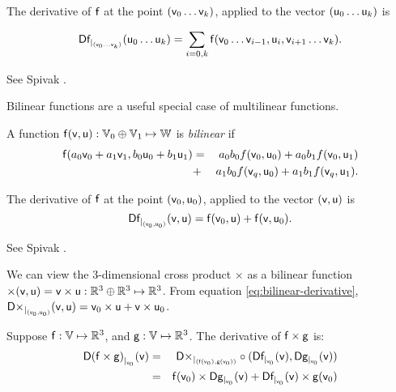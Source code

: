 The derivative of $\mathsf{f}$
at the point $(\mathsf{v}_0 \ldots \mathsf{v}_k)$, applied to the vector $(\mathsf{u}_0 \ldots \mathsf{u}_k)$ is

\begin{equation}
{\mathsf{D}{\mathsf{f}}_{\mid_{(\mathsf{v}_0 \ldots \mathsf{v}_k)}}({\mathsf{u}_0 \ldots \mathsf{u}_k})}
 =  \sum_{i=0,k} \mathsf{f}(\mathsf{v}_0 \ldots \mathsf{v}_{i-1},\mathsf{u}_i,\mathsf{v}_{i+1} \ldots \mathsf{v}_k).
\end{equation}

See Spivak \cite[ex.~2-14]{spivak-1965}.

\label{sec:Derivatives-of-bilinear-functions}

Bilinear functions are a useful special case of multilinear functions.

A function $\mathsf{f}(\mathsf{v},\mathsf{u}):\mathbb{V}_0 \oplus \mathbb{V}_1 \mapsto \mathbb{W}$
is \textit{bilinear} if
\begin{eqnarray}
\mathsf{f}(a_0 \mathsf{v}_0 + a_1 \mathsf{v}_1, b_0 \mathsf{u}_0 + b_1 \mathsf{u}_1)
& =  & a_0 b_0 f(\mathsf{v}_0,\mathsf{u}_0)
+  a_0 b_1 f(\mathsf{v}_0,\mathsf{u}_1)
\\
& +  & a_1 b_0 f(\mathsf{v}_q,\mathsf{u}_0)
 +  a_1 b_1 f(\mathsf{v}_q,\mathsf{u}_1).
\nonumber
\end{eqnarray}

The derivative of $\mathsf{f}$
at the point $(\mathsf{v}_0,\mathsf{u}_0)$, applied to the vector $(\mathsf{v},\mathsf{u})$ is
\begin{equation}
\label{eq:bilinear-derivative}
\Dc{\f}{(\v_0,\u_0)}{\v,\u} = \f(\v_0,\u) + \f(\v,\u_0).
\end{equation}

See Spivak \cite[ex.~2-12]{spivak-1965}.

\label{sec:Derivatives-of-cross-products}

We can view the 3-dimensional cross product
$ \times $
as a bilinear function
$\times(\mathsf{v},\mathsf{u}) = \mathsf{v} \times \mathsf{u} : \mathbb{R}^3 \oplus \mathbb{R}^3 \mapsto \mathbb{R}^3$.
From equation \ref{eq:bilinear-derivative},
${\mathsf{D}{\times}_{\mid_{(\mathsf{v}_0,\mathsf{u}_0)}}({\mathsf{v},\mathsf{u}})} = \mathsf{v}_0 \times \mathsf{u} + \mathsf{v} \times \mathsf{u}_0$.

Suppose
$\mathsf{f}:\mathbb{V} \mapsto \mathbb{R}^3$, and
$\mathsf{g}:\mathbb{V} \mapsto \mathbb{R}^3$.
The derivative of $\mathsf{f} \times \mathsf{g}$ is:
\begin{eqnarray}
{\mathsf{D}{(\mathsf{f}\times \mathsf{g})}_{\mid_{\mathsf{v}_0}}({\mathsf{v}})}
& =
& {\mathsf{D}{\times}_{\mid_{(\mathsf{f}(\mathsf{v}_0),\mathsf{g}(\mathsf{v}_0))}}} \circ ({\mathsf{D}{\mathsf{f}}_{\mid_{\mathsf{v}_0}}({\mathsf{v}})}, {\mathsf{D}{\mathsf{g}}_{\mid_{\mathsf{v}_0}}({\mathsf{v}})})
\\
& =
& \mathsf{f}(\mathsf{v}_0) \times {\mathsf{D}{\mathsf{g}}_{\mid_{\mathsf{v}_0}}({\mathsf{v}})} + {\mathsf{D}{\mathsf{f}}_{\mid_{\mathsf{v}_0}}({\mathsf{v}})} \times \mathsf{g}(\mathsf{v}_0) \nonumber
\end{eqnarray}


